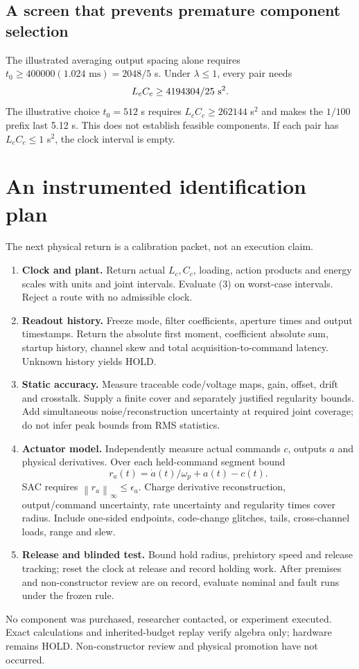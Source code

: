 \documentclass[10pt,a4paper]{article}
\newcommand{\norm}[1]{\left\|#1\right\|_\infty}
\begin{document}
\subsection*{A screen that prevents premature component selection}
The illustrated averaging output spacing alone requires
$t_0\geq400000(1.024\text{ ms})=2048/5$ s. Under $\lambda\leq1$, every pair needs
\begin{equation}
L_cC_c\geq4194304/25\ {\rm s}^2 .
\end{equation}
The illustrative choice $t_0=512$ s requires $L_cC_c\geq262144$ s$^2$ and makes the $1/100$ prefix last 5.12 s. This does not establish feasible components. If each pair has $L_cC_c\leq1$ s$^2$, the clock interval is empty.
\newpage
\section{An instrumented identification plan}
The next physical return is a calibration packet, not an execution claim.
\begin{enumerate}[leftmargin=*,itemsep=4pt]
\item \textbf{Clock and plant.} Return actual $L_c,C_c$, loading, action products and energy scales with units and joint intervals. Evaluate (3) on worst-case intervals. Reject a route with no admissible clock.
\item \textbf{Readout history.} Freeze mode, filter coefficients, aperture times and output timestamps. Return the absolute first moment, coefficient absolute sum, startup history, channel skew and total acquisition-to-command latency. Unknown history yields HOLD.
\item \textbf{Static accuracy.} Measure traceable code/voltage maps, gain, offset, drift and crosstalk. Supply a finite cover and separately justified regularity bounds. Add simultaneous noise/reconstruction uncertainty at required joint coverage; do not infer peak bounds from RMS statistics.
\item \textbf{Actuator model.} Independently measure actual commands $c$, outputs $a$ and physical derivatives. Over each held-command segment bound
\[
r_a(t)=\dot a(t)/\omega_p+a(t)-c(t).
\]
SAC requires $\norm{r_a}\leq\epsilon_a$. Charge derivative reconstruction, output/command uncertainty, rate uncertainty and regularity times cover radius. Include one-sided endpoints, code-change glitches, tails, cross-channel loads, range and slew.
\item \textbf{Release and blinded test.} Bound hold radius, prehistory speed and release tracking; reset the clock at release and record holding work. After premises and non-constructor review are on record, evaluate nominal and fault runs under the frozen rule.
\end{enumerate}
No component was purchased, researcher contacted, or experiment executed. Exact calculations and inherited-budget replay verify algebra only; hardware remains HOLD. Non-constructor review and physical promotion have not occurred.
\end{document}
